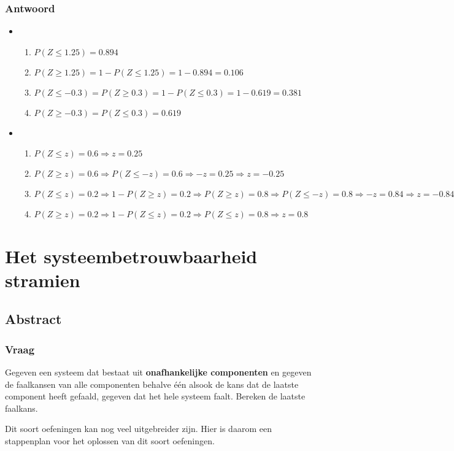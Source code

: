 \documentclass[main.tex]{subfiles}
\begin{document}
\subsubsection*{Antwoord}
\begin{itemize}
\item
  \begin{enumerate}
  \item $P(Z \le 1.25) = 0.894$
  \item $P(Z \ge 1.25) = 1-P(Z \le 1.25) = 1- 0.894 = 0.106$
  \item $P(Z \le -0.3) = P(Z \ge 0.3) = 1- P(Z \le 0.3) = 1-0.619 = 0.381$
  \item $P(Z \ge -0.3) = P(Z \le 0.3) = 0.619$
  \end{enumerate}
\item
  \begin{enumerate}
  \item $P(Z \le z) = 0.6 \Rightarrow z = 0.25$
  \item $P(Z \ge z) = 0.6 \Rightarrow P(Z \le -z) = 0.6 \Rightarrow -z = 0.25 \Rightarrow z = -0.25$ 
  \item $P(Z \le z) = 0.2 \Rightarrow 1-P(Z \ge z) = 0.2 \Rightarrow P(Z \ge z) = 0.8 \Rightarrow P(Z \le -z) = 0.8 \Rightarrow -z = 0.84 \Rightarrow z = -0.84$
  \item $P(Z \ge z) = 0.2 \Rightarrow 1-P(Z \le z) = 0.2 \Rightarrow P(Z \le z) = 0.8 \Rightarrow z = 0.8$
  \end{enumerate}
\end{itemize}


\newpage
\section{Het systeembetrouwbaarheid stramien}
\subsection*{Abstract}
\subsubsection*{Vraag}
Gegeven een systeem dat bestaat uit \textbf{onafhankelijke componenten} en gegeven de faalkansen van alle componenten behalve \'e\'en alsook de kans dat de laatste component heeft gefaald, gegeven dat het hele systeem faalt.
Bereken de laatste faalkans.

Dit soort oefeningen kan nog veel uitgebreider zijn.
Hier is daarom een stappenplan voor het oplossen van dit soort oefeningen.
\end{document}
